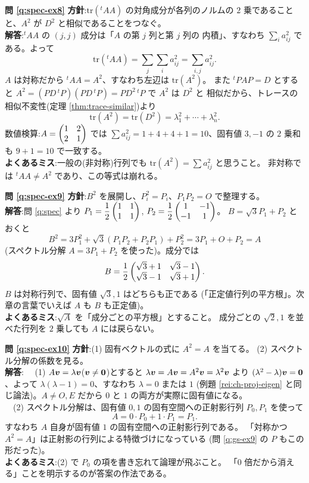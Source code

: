 \bigskip
\noindent\textbf{問 \ref{q:spec-ex8}}\quad
\textbf{方針}:$\mathrm{tr}({}^t\!AA)$ の対角成分が各列のノルムの
$2$ 乗であることと、$A^2$ が $D^2$ と相似であることをつなぐ。\\
\textbf{解答}:${}^t\!AA$ の $(j, j)$ 成分は「$A$ の第 $j$ 列と第 $j$ 列の
内積」、すなわち $\sum_i a_{ij}^2$ である。よって
\[
\mathrm{tr}({}^t\!AA) = \sum_j \sum_i a_{ij}^2 = \sum_{i,j} a_{ij}^2.
\]
$A$ は対称だから ${}^t\!AA = A^2$、すなわち左辺は $\mathrm{tr}(A^2)$。
また ${}^t\!PAP = D$ とすると
$A^2 = (PD\,{}^t\!P)(PD\,{}^t\!P) = PD^2\,{}^t\!P$ で $A^2$ は $D^2$ と
相似だから、トレースの相似不変性(定理 \ref{thm:trace-similar})より
\[
\mathrm{tr}(A^2) = \mathrm{tr}(D^2) = \lambda_1^2 + \cdots + \lambda_n^2.
\]
数値検算:$A = \begin{pmatrix}1 & 2 \\ 2 & 1\end{pmatrix}$ では
$\sum a_{ij}^2 = 1 + 4 + 4 + 1 = 10$、固有値 $3, -1$ の $2$ 乗和も
$9 + 1 = 10$ で一致する。\\
\textbf{よくあるミス}:一般の(非対称)行列でも
$\mathrm{tr}(A^2) = \sum a_{ij}^2$ と思うこと。
非対称では ${}^t\!AA \neq A^2$ であり、この等式は崩れる。

\bigskip
\noindent\textbf{問 \ref{q:spec-ex9}}\quad
\textbf{方針}:$B^2$ を展開し、$P_i^2 = P_i$、$P_1P_2 = O$ で整理する。\\
\textbf{解答}:問 \ref{q:spec} より
$P_1 = \dfrac{1}{2}\begin{pmatrix}1 & 1 \\ 1 & 1\end{pmatrix}$,
$P_2 = \dfrac{1}{2}\begin{pmatrix}1 & -1 \\ -1 & 1\end{pmatrix}$。
$B = \sqrt{3}P_1 + P_2$ とおくと
\[
B^2 = 3P_1^2 + \sqrt{3}(P_1P_2 + P_2P_1) + P_2^2
= 3P_1 + O + P_2 = A
\]
(スペクトル分解 $A = 3P_1 + P_2$ を使った)。成分では
\[
B = \frac{1}{2}\begin{pmatrix}\sqrt{3} + 1 & \sqrt{3} - 1 \\ \sqrt{3} - 1 & \sqrt{3} + 1\end{pmatrix}.
\]
$B$ は対称行列で、固有値 $\sqrt{3}, 1$ はどちらも正である
(「正定値行列の平方根」。次章の言葉でいえば $A$ も $B$ も正定値)。\\
\textbf{よくあるミス}:$\sqrt{A}$ を「成分ごとの平方根」とすること。
成分ごとの $\sqrt{2}, 1$ を並べた行列を $2$ 乗しても $A$ には戻らない。

\bigskip
\noindent\textbf{問 \ref{q:spec-ex10}}\quad
\textbf{方針}:(1) 固有ベクトルの式に $A^2 = A$ を当てる。
(2) スペクトル分解の係数を見る。\\
\textbf{解答}:
　(1) $A\bm{v} = \lambda\bm{v}$($\bm{v} \neq \bm{0}$)とすると
$\lambda\bm{v} = A\bm{v} = A^2\bm{v} = \lambda^2\bm{v}$ より
$(\lambda^2 - \lambda)\bm{v} = \bm{0}$、よって
$\lambda(\lambda - 1) = 0$、すなわち $\lambda = 0$ または $1$
(例題 \ref{rei:ch-proj-eigen} と同じ論法)。$A \neq O, E$ だから
$0$ と $1$ の両方が実際に固有値になる。\\
　(2) スペクトル分解は、固有値 $0, 1$ の固有空間への正射影行列
$P_0, P_1$ を使って
\[
A = 0 \cdot P_0 + 1 \cdot P_1 = P_1.
\]
すなわち $A$ 自身が固有値 $1$ の固有空間への正射影行列である。
「対称かつ $A^2 = A$」は正射影の行列による特徴づけになっている
(問 \ref{q:gs-ex9} の $P$ もこの形だった)。\\
\textbf{よくあるミス}:(2) で $P_0$ の項を書き忘れて論理が飛ぶこと。
「$0$ 倍だから消える」ことを明示するのが答案の作法である。

